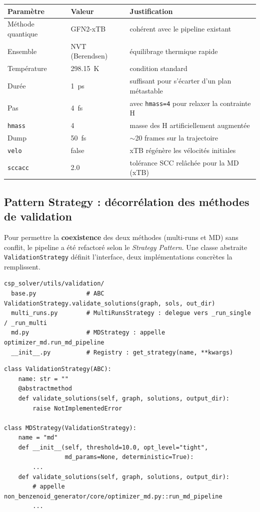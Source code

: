 \documentclass[12pt,a4paper]{article}
\theoremstyle{definition}
\begin{document}
\begin{center}
\begin{tabular}{lll}
  \toprule
  Paramètre & Valeur & Justification \\
  \midrule
  Méthode quantique & GFN2-xTB    & cohérent avec le pipeline existant \\
  Ensemble          & NVT (Berendsen) & équilibrage thermique rapide \\
  Température       & 298.15~K    & condition standard \\
  Durée             & 1~ps        & suffisant pour s'écarter d'un plan métastable \\
  Pas               & 4~fs        & avec \texttt{hmass=4} pour relaxer la contrainte H \\
  \texttt{hmass}    & 4           & masse des H artificiellement augmentée \\
  Dump              & 50~fs       & $\sim$20 frames sur la trajectoire \\
  \texttt{velo}     & false       & xTB régénère les vélocités initiales \\
  \texttt{sccacc}   & 2.0         & tolérance SCC relâchée pour la MD (xTB) \\
  \bottomrule
\end{tabular}
\end{center}

\subsection{Pattern Strategy : décorrélation des méthodes de validation}

Pour permettre la \textbf{coexistence} des deux méthodes (multi-runs et MD) sans conflit, le
pipeline a été refactoré selon le \emph{Strategy Pattern}. Une classe abstraite
\texttt{ValidationStrategy} définit l'interface, deux implémentations concrètes la remplissent.

\begin{lstlisting}[style=benzai]
csp_solver/utils/validation/
  base.py              # ABC ValidationStrategy.validate_solutions(graph, sols, out_dir)
  multi_runs.py        # MultiRunsStrategy : delegue vers _run_single / _run_multi
  md.py                # MDStrategy : appelle optimizer_md.run_md_pipeline
  __init__.py          # Registry : get_strategy(name, **kwargs)
\end{lstlisting}

\begin{lstlisting}
class ValidationStrategy(ABC):
    name: str = ""
    @abstractmethod
    def validate_solutions(self, graph, solutions, output_dir):
        raise NotImplementedError

class MDStrategy(ValidationStrategy):
    name = "md"
    def __init__(self, threshold=10.0, opt_level="tight",
                 md_params=None, deterministic=True):
        ...
    def validate_solutions(self, graph, solutions, output_dir):
        # appelle non_benzenoid_generator/core/optimizer_md.py::run_md_pipeline
        ...
\end{lstlisting}
\end{document}
